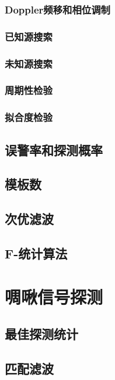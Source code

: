 \subsubsection{Doppler频移和相位调制}
\subsubsection{已知源搜索}
\subsubsection{未知源搜索}
\subsubsection{周期性检验}
\subsubsection{拟合度检验}
\subsection{误警率和探测概率}
\subsection{模板数}
\subsection{次优滤波}
\subsection{F-统计算法}

\section{啁啾信号探测}
\subsection{最佳探测统计}
\subsection{匹配滤波}
